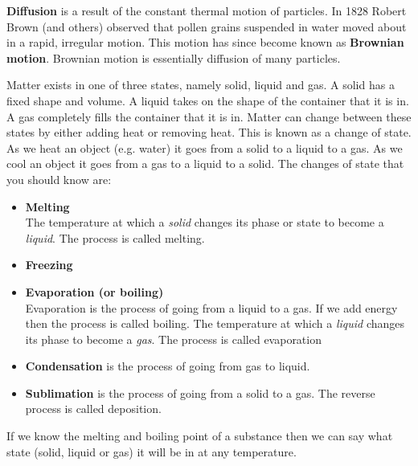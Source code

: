 \par 
\label{m38736*id10987324}\textbf{Diffusion} is a result of the constant thermal motion of particles. In 1828 Robert Brown (and others) observed that pollen grains suspended in water moved about in a rapid, irregular motion. This motion has since become known as \textbf{Brownian motion}. Brownian motion is essentially diffusion of many particles.
\par 
\label{m38736*id48327}Matter exists in one of three states, namely solid, liquid and gas. A solid has a fixed shape and volume. A liquid takes on the shape of the container that it is in. A gas completely fills the container that it is in. Matter can change between these states by either adding heat or removing heat. This is known as a change of state. As we heat an object (e.g. water) it goes from a solid to a liquid to a gas. As we cool an object it goes from a gas to a liquid to a solid.
The changes of state that you should know are:
\label{m38736*id02341}\begin{itemize}[noitemsep]
\item \textbf{Melting} \\ 
 { \label{m38734*meaningfhsst!!!underscore!!!id276}
The temperature at which a \textsl{solid} changes 
its phase or state to become a \textsl{liquid}. The 
process is called melting. 
 } 
\item \textbf{Freezing} \\
\item \textbf{Evaporation (or boiling)} \\
Evaporation is the process of going from a liquid to a gas. If we add energy then the process is called boiling.
 { \label{m38734*meaningfhsst!!!underscore!!!id282}
The temperature at which a \textsl{liquid} changes 
its phase to become a \textsl{gas}. The process is called evaporation} 
\item \textbf{Condensation} is the process of going from gas to liquid.
\item \textbf{Sublimation} is the process of going from a solid to a gas. The reverse process is called deposition.\end{itemize}
\par \label{m38736*eip-957}If we know the melting and boiling point of a substance then we can say what state (solid, liquid or gas) it will be in at any temperature. \par 
